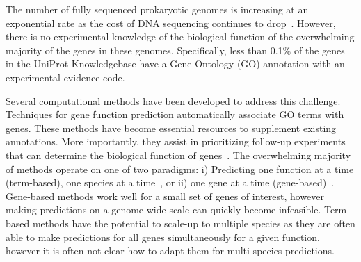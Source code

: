 
The number of fully sequenced prokaryotic genomes is increasing at an exponential rate as the cost of DNA sequencing  continues to drop~\cite{land-ussery-20-years-bact-seq-2015}.
However, there is no experimental knowledge of the biological function of the overwhelming majority of the genes in these genomes. 
Specifically, less than 0.1\% of the genes in the UniProt Knowledgebase have a Gene Ontology (GO) annotation with an experimental evidence code. 

Several computational methods have been developed to address this challenge.  Techniques for gene function prediction automatically associate GO terms with genes. These methods have become essential resources to supplement existing annotations. More importantly, they assist in prioritizing follow-up experiments that can determine the biological function of genes~\cite{chang-steffen-combrexdb-nar-2015}. 
The overwhelming majority of \pfp methods operate on one of two paradigms: i) Predicting one function at a time (term-based), one species at a time~\cite{youngs-bonneau-better-negatives-pfp-bioinfo-2013,wang-pang-clusdca-exploit_ontol_graph-bioinfo-2015,cho-peng-mashup-cellsys-2016,gligorijevic-bonneau-deepnf-bioinfo-2018}, or ii) one gene at a time (gene-based)~\cite{cozzetto-jones-pfp-massive-integration-bmcbioinfo-2013,piovesan-tosatto-inga-nar-2015,Jiang-Gribskov-AptRank-protein-function-prediction-bioinfo-2017,yunes-babbitt-effusion-seq-sim-net-bioinfo-2018,zhang-zhang-metago-jmb-2018}.   %
Gene-based methods work well for a small set of genes of interest, however making predictions on a genome-wide scale can quickly become infeasible.
Term-based methods have the potential to scale-up to multiple species as they are often able to make predictions for all genes simultaneously for a given function, however it is often not clear how to adapt them for multi-species predictions.

